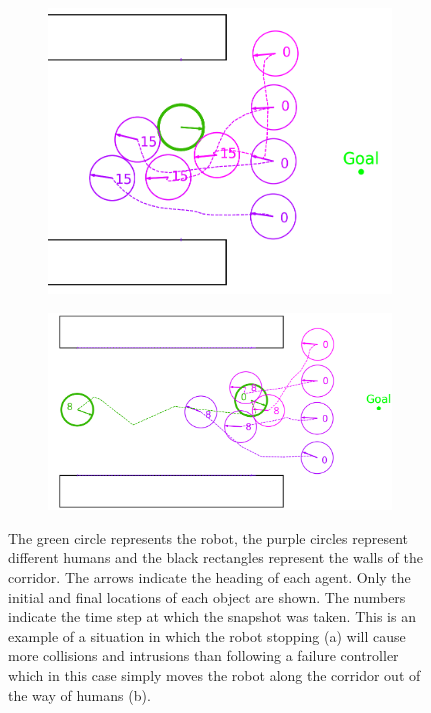 \documentclass[letterpaper, 10 pt, conference]{ieeeconf}  %
\begin{document}
	\begin{figure}
		\centering
		\begin{subfigure}[t]{0.49\linewidth}
			\includegraphics[width=\linewidth]{dnmotive}
			\caption{}
			\label{fig:dnmotivation}
		\end{subfigure}
		\begin{subfigure}[t]{0.49\linewidth}
			\includegraphics[width=\linewidth]{rlmotive}
			\caption{}
			\label{fig:rlmotivation}
		\end{subfigure}
		\caption{The green circle represents the robot, the purple circles represent different humans and the black rectangles represent the walls of the corridor. The arrows indicate the heading of each agent. Only the initial and final locations of each object are shown. The numbers indicate the time step at which the snapshot was taken. This is an example of a situation in which the robot stopping (a) will cause more collisions and intrusions than following a failure controller which in this case simply moves the robot along the corridor out of the way of humans (b).}
		\label{fig:motivation}
	\end{figure}
	
\end{document}
